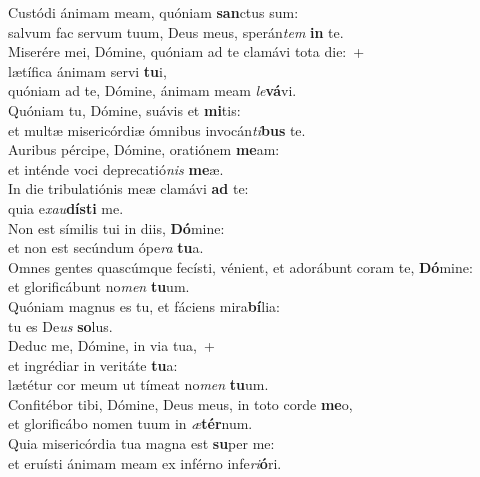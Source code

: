 \evenverse Custódi ánimam meam, quóniam \textbf{san}ctus sum:~\*\\
\evenverse salvum fac servum tuum, Deus meus, sperán\textit{tem} \textbf{in} te.\\
\oddverse Miserére mei, Dómine, quóniam ad te clamávi tota die:~+\\
\oddverse  lætífica ánimam servi \textbf{tu}i,~\*\\
\oddverse quóniam ad te, Dómine, ánimam meam \textit{le}\textbf{vá}vi.\\
\evenverse Quóniam tu, Dómine, suávis et \textbf{mi}tis:~\*\\
\evenverse et multæ misericórdiæ ómnibus invocán\textit{ti}\textbf{bus} te.\\
\oddverse Auribus pércipe, Dómine, oratiónem \textbf{me}am:~\*\\
\oddverse et inténde voci deprecatió\textit{nis} \textbf{me}æ.\\
\evenverse In die tribulatiónis meæ clamávi \textbf{ad} te:~\*\\
\evenverse quia e\textit{xau}\textbf{dí}\textbf{sti} me.\\
\oddverse Non est símilis tui in diis, \textbf{Dó}mine:~\*\\
\oddverse et non est secúndum ópe\textit{ra} \textbf{tu}a.\\
\evenverse Omnes gentes quascúmque fecísti, vénient, et adorábunt coram te, \textbf{Dó}mine:~\*\\
\evenverse et glorificábunt no\textit{men} \textbf{tu}um.\\
\oddverse Quóniam magnus es tu, et fáciens mira\textbf{bí}lia:~\*\\
\oddverse tu es De\textit{us} \textbf{so}lus.\\
\evenverse Deduc me, Dómine, in via tua,~+\\
\evenverse  et ingrédiar in veritáte \textbf{tu}a:~\*\\
\evenverse lætétur cor meum ut tímeat no\textit{men} \textbf{tu}um.\\
\oddverse Confitébor tibi, Dómine, Deus meus, in toto corde \textbf{me}o,~\*\\
\oddverse et glorificábo nomen tuum in \textit{æ}\textbf{tér}num.\\
\evenverse Quia misericórdia tua magna est \textbf{su}per me:~\*\\
\evenverse et eruísti ánimam meam ex inférno infe\textit{ri}\textbf{ó}ri.\\
